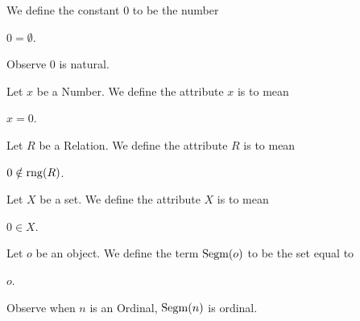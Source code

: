 \documentclass{article}
\begin{document}
\begin{definition}
We define the constant $0$ to be the number 
\begin{defn}
\item $0 = \emptyset$.
\end{defn}
\end{definition}
Observe $0$ is natural.

\begin{definition}
Let $x$ be a Number. We define the attribute $x$ is  to
mean
\begin{defn}
\item $x=0$.
\end{defn}
\end{definition}

\begin{definition}
Let $R$ be a Relation. We define the attribute $R$ is 
to mean
\begin{defn}
\item $0\notin\operatorname{rng}(R)$.
\end{defn}
\end{definition}

\begin{definition}
Let $X$ be a set. We define the attribute $X$ is  to
mean
\begin{defn}
\item $0\in X$.
\end{defn}
\end{definition}

\begin{definition}
Let $o$ be an object. We define the term $\operatorname{Segm}(o)$ to be the set equal
to
\begin{defn}
\item $o$.
\end{defn}
\end{definition}
Observe when $n$ is an Ordinal, $\operatorname{Segm}(n)$ is ordinal.
\end{document}
